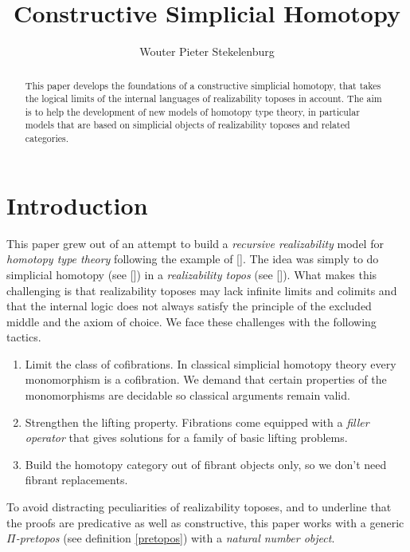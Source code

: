 \documentclass{tac}
\title{Constructive Simplicial Homotopy}
\author{Wouter Pieter Stekelenburg}
\newcommand\hide[1]{}
\newcommand\citep[1]{[\cite{#1}]}
\begin{document}
\begin{abstract} This paper develops the foundations of a constructive simplicial homotopy, that takes the logical limits of the internal languages of realizability toposes in account. The aim is to help the development of new models of homotopy type theory, in particular models that are based on simplicial objects of realizability toposes and related categories. \end{abstract}

\hide{
Three papers:
-simplicial homotopy
-complete categories [how they are preserved]
-the realizability model of HOTT [how to get a fibrant object out of a category]

Idea: reverse the order. definitions--theorem--lemmas. That way the purpose of the lemmas is set up from the start.
}

\maketitle

\section*{Introduction}
This paper grew out of an attempt to build a \emph{recursive realizability} model for \emph{homotopy type theory} following the example of \citep{KLV12}. The idea was simply to do simplicial homotopy (see \citep{Hovey99,GJSHT}) in a \emph{realizability topos} (see \citep{MR2479466}). 
What makes this challenging is that realizability toposes may lack infinite limits and colimits and that the internal logic does not always satisfy the principle of the excluded middle and the axiom of choice. We face these challenges with the following tactics.
\begin{enumerate}
\item Limit the class of cofibrations. In classical simplicial homotopy theory every mono\-morphism is a cofibration. We demand that certain properties of the monomorphisms are decidable so classical arguments remain valid.
\item Strengthen the lifting property. Fibrations come equipped with a \emph{filler operator} that gives solutions for a family of basic lifting problems.
\item Build the homotopy category out of fibrant objects only, so we don't need fibrant replacements.
\end{enumerate}
To avoid distracting peculiarities of realizability toposes, and to underline that the proofs are predicative as well as constructive, this paper works with a generic \emph{$\Pi$-pretopos} (see definition \ref{pretopos}) with a \emph{natural number object}.
\end{document}
